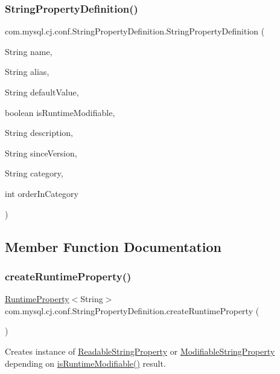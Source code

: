 \subsubsection{\texorpdfstring{String\+Property\+Definition()}{StringPropertyDefinition()}}
{\footnotesize\ttfamily com.\+mysql.\+cj.\+conf.\+String\+Property\+Definition.\+String\+Property\+Definition (\begin{DoxyParamCaption}\item[{String}]{name,  }\item[{String}]{alias,  }\item[{String}]{default\+Value,  }\item[{boolean}]{is\+Runtime\+Modifiable,  }\item[{String}]{description,  }\item[{String}]{since\+Version,  }\item[{String}]{category,  }\item[{int}]{order\+In\+Category }\end{DoxyParamCaption})}



\subsection{Member Function Documentation}
\mbox{\label{classcom_1_1mysql_1_1cj_1_1conf_1_1_string_property_definition_a1d4bb7606f37440e5eb68b6724647fd1}} 
\subsubsection{\texorpdfstring{create\+Runtime\+Property()}{createRuntimeProperty()}}
{\footnotesize\ttfamily \mbox{\hyperlink{interfacecom_1_1mysql_1_1cj_1_1conf_1_1_runtime_property}{Runtime\+Property}}$<$String$>$ com.\+mysql.\+cj.\+conf.\+String\+Property\+Definition.\+create\+Runtime\+Property (\begin{DoxyParamCaption}{ }\end{DoxyParamCaption})}

Creates instance of \mbox{\hyperlink{classcom_1_1mysql_1_1cj_1_1conf_1_1_readable_string_property}{Readable\+String\+Property}} or \mbox{\hyperlink{classcom_1_1mysql_1_1cj_1_1conf_1_1_modifiable_string_property}{Modifiable\+String\+Property}} depending on \mbox{\hyperlink{classcom_1_1mysql_1_1cj_1_1conf_1_1_abstract_property_definition_a6c98140b2db84ccd0ff29ce165ec9ef5}{is\+Runtime\+Modifiable()}} result.

